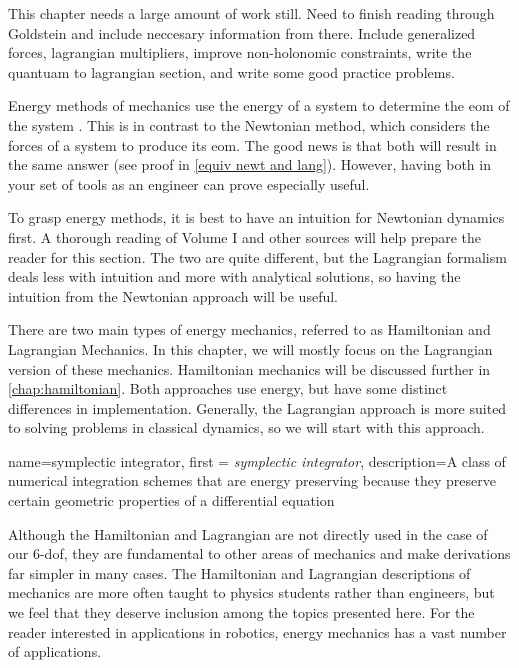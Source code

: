 \color{red} This chapter needs a large amount of work still. Need to finish reading through Goldstein and include neccesary information from there. Include generalized forces, lagrangian multipliers, improve non-holonomic constraints, write the quantuam to lagrangian section, and write some good practice problems.

\color{black}

Energy methods of mechanics use the energy of a system to determine the \gls{eom} of the system . This is in contrast to the Newtonian method, which considers the forces of a system to produce its \gls{eom}. The good news is that both will result in the same answer (see proof in \autoref{equiv newt and lang}). However, having both in your set of tools as an engineer can prove especially useful.

To grasp energy methods, it is best to have an intuition for Newtonian dynamics first. A thorough reading of Volume I and other sources will help prepare the reader for this section. The two are quite different, but the \gls{Lagrangian} formalism deals less with intuition and more with analytical solutions, so having the intuition from the Newtonian approach will be useful.

There are two main types of energy mechanics, referred to as \gls{Hamiltonian} and \gls{Lagrangian} Mechanics. In this chapter, we will mostly focus on the \gls{Lagrangian} version of these mechanics. \gls{Hamiltonian} mechanics will be discussed further in \autoref{chap:hamiltonian}. Both approaches use energy, but have some distinct differences in implementation. Generally, the \gls{Lagrangian} approach is more suited to solving problems in classical dynamics, so we will start with this approach.

{
    name=symplectic integrator,
    first = {\textit{symplectic integrator}},
    description={A class of numerical integration schemes that are energy preserving because they preserve certain geometric properties of a differential equation}
}

Although the \gls{Hamiltonian} and \gls{Lagrangian} are not directly used in the case of our 6-\gls{dof}, they are fundamental to other areas of mechanics and make derivations far simpler in many cases. The \gls{Hamiltonian} and \gls{Lagrangian} descriptions of mechanics are more often taught to physics students rather than engineers, but we feel that they deserve inclusion among the topics presented here. For the reader interested in applications in robotics, energy mechanics has a vast number of applications.

